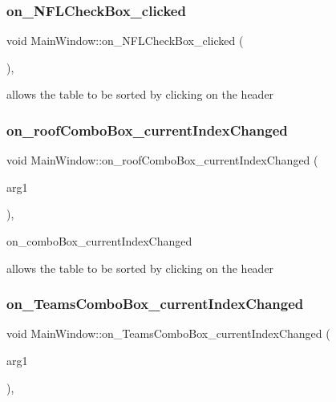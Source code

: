 \subsubsection{\texorpdfstring{on\+\_\+\+N\+F\+L\+Check\+Box\+\_\+clicked}{on\_NFLCheckBox\_clicked}}
{\footnotesize\ttfamily void Main\+Window\+::on\+\_\+\+N\+F\+L\+Check\+Box\+\_\+clicked (\begin{DoxyParamCaption}{ }\end{DoxyParamCaption})\hspace{0.3cm}{\ttfamily [private]}, {\ttfamily [slot]}}

allows the table to be sorted by clicking on the header \mbox{\label{class_main_window_aff2bf52ba8193c96f87e98359fe39041}} 
\subsubsection{\texorpdfstring{on\+\_\+roof\+Combo\+Box\+\_\+current\+Index\+Changed}{on\_roofComboBox\_currentIndexChanged}}
{\footnotesize\ttfamily void Main\+Window\+::on\+\_\+roof\+Combo\+Box\+\_\+current\+Index\+Changed (\begin{DoxyParamCaption}\item[{const Q\+String \&}]{arg1 }\end{DoxyParamCaption})\hspace{0.3cm}{\ttfamily [private]}, {\ttfamily [slot]}}



on\+\_\+combo\+Box\+\_\+current\+Index\+Changed 

allows the table to be sorted by clicking on the header \mbox{\label{class_main_window_a6b44c6e98ed39eb1a633c93c60f34e6f}} 
\subsubsection{\texorpdfstring{on\+\_\+\+Teams\+Combo\+Box\+\_\+current\+Index\+Changed}{on\_TeamsComboBox\_currentIndexChanged}}
{\footnotesize\ttfamily void Main\+Window\+::on\+\_\+\+Teams\+Combo\+Box\+\_\+current\+Index\+Changed (\begin{DoxyParamCaption}\item[{const Q\+String \&}]{arg1 }\end{DoxyParamCaption})\hspace{0.3cm}{\ttfamily [private]}, {\ttfamily [slot]}}



